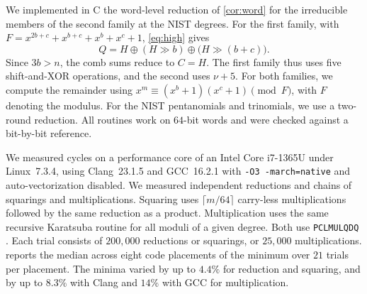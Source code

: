 \documentclass{ieeeaccess}
\theoremstyle{plain}
\theoremstyle{definition}
\newcommand{\xor}{\oplus}
\begin{document}
We implemented in C the word-level reduction of \cref{cor:word} for
the irreducible members of the second family at the NIST degrees. For
the first family, with $F=x^{2b+c}+x^{b+c}+x^b+x^c+1$,
\eqref{eq:high} gives
\[
Q=H\xor(H\gg b)\xor\bigl(H\gg(b+c)\bigr).
\]
Since $3b>n$, the comb sums reduce to $C=H$. The first family thus uses
five shift-and-XOR operations, and the second uses $\nu+5$. For both
families, we compute the remainder using
$x^m\equiv(x^b+1)(x^c+1)\pmod F$, with $F$ denoting the modulus.
For the NIST pentanomials and trinomials, we use a two-round reduction.
All routines work on $64$-bit words and were checked against a bit-by-bit
reference.

We measured cycles on a performance core of an Intel Core i7-1365U
under Linux~7.3.4, using Clang~23.1.5 and GCC~16.2.1 with
\texttt{-O3 -march=native} and auto-vectorization disabled.
We measured independent reductions and chains of squarings and
multiplications. Squaring uses $\lceil m/64\rceil$ carry-less
multiplications followed by the same reduction as a product.
Multiplication uses the same recursive Karatsuba routine for all moduli
of a given degree. Both use \texttt{PCLMULQDQ}
\cite{GueronKounavis2010}. Each trial consists of $200,000$
reductions or squarings, or $25,000$ multiplications.
 reports the median across eight code placements
of the minimum over $21$ trials per placement. The minima varied by
up to $4.4\%$ for reduction and squaring, and by up to $8.3\%$ with
Clang and $14\%$ with GCC for multiplication.
\end{document}

